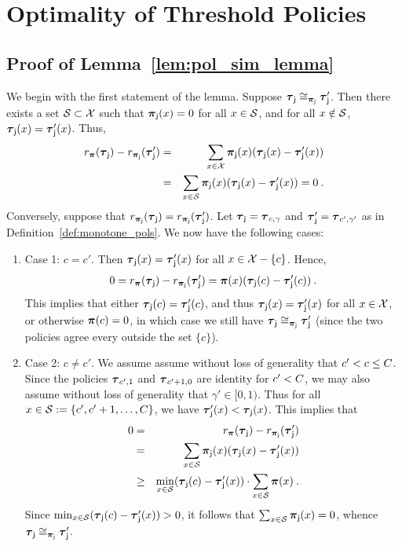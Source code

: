 \section{Optimality of Threshold Policies}

\subsection{Proof of Lemma~\ref{lem:pol_sim_lemma}\label{sec:lem_pol_sim}} 
	
	We begin with the first statement of the lemma. Suppose $\polj \simj \polj'$. Then there exists a set $\calS \subset \X$ such that $\distj(x) = 0$ for all $x \in \calS$, and for all $x \notin \calS$, $\polj(x) = \polj'(x)$. Thus, 
	\begin{eqnarray*}
	\ratef_{\dist}(\polj) - \ratef_{\distj}(\polj') &=& \sum_{x \in \X}\distj(x)(\polj(x) - \polj'(x)) \\
	&=& \sum_{x \in \calS}\distj(x)(\polj(x) - \polj'(x)) = 0\:. \\
	\end{eqnarray*}
	Conversely, suppose that $\ratefj(\polj) = \ratefj(\polj')$. 
	Let $\polj = \pol_{c,\gamma}$ and $\polj' = \pol_{c',\gamma'}$ as in Definition~\ref{def:monotone_pols}. We now have the following cases:
	\begin{enumerate}
		\item Case 1: $c = c'$. Then $\polj(x) = \polj'(x)$ for all $x \in \X -\{c\}$. Hence, 
		\begin{eqnarray*}
		0 = \ratef_{\dist}(\polj) - \ratef_{\distj}(\polj') = \dist(x)(\polj(c) - \polj'(c)) \:.
		\end{eqnarray*}
		This implies that either $\polj(c) = \polj'(c)$, and thus $\polj(x) = \polj'(x)$ for all $x \in \X$, or otherwise $\dist(c) = 0$, in which case we still have $\polj \simj \polj'$ (since the two policies agree every outside the set $\{c\}$). 
		\item Case 2: $c \ne c'$. We assume assume without loss of generality that $c' < c \le \maxscore$. Since the policies $\pol_{c',1}$ and $\pol_{c'+1,0}$ are identity for $c' < \maxscore$, we may also assume without loss of generality that $\gamma' \in [0,1)$. Thus for all $x \in \calS:= \{c',c'+1,\dots,C\}$, we have $\polj'(x) < \polj(x)$. This implies that 
		\begin{eqnarray*}
		0 &=& \ratef_{\dist}(\polj) - \ratef_{\distj}(\polj') \\
		&=& \sum_{x \in \calS} \distj(x)(\polj(x) - \polj'(x)) \\
		&\ge& \min_{x \in \calS}(\polj(c) - \polj'(x)) \cdot  \sum_{x \in \calS} \dist(x)\:.
		\end{eqnarray*}
		Since $\min_{x \in \calS}(\polj(c) - \polj'(x))  > 0$, it follows that $\sum_{x \in \calS} \distj(x) = 0$, whence $\polj \simj \polj'$.  
		\end{enumerate}

